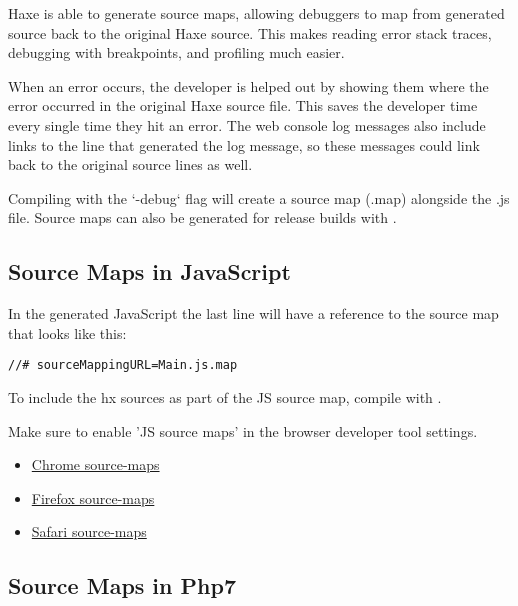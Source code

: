 Haxe is able to generate source maps, allowing debuggers to map from generated source back to the original Haxe source. This makes reading error stack traces, debugging with breakpoints, and profiling much easier.

When an error occurs, the developer is helped out by showing them where the error occurred in the original Haxe source file. This saves the developer time every single time they hit an error. The web console log messages also include links to the line that generated the log message, so these messages could link back to the original source lines as well. 

Compiling with the `-debug` flag will create a source map (.map) alongside the .js file. Source maps can also be generated for release builds with .


\subsection{Source Maps in JavaScript}
\label{debugging-source-map-javascript}

In the generated JavaScript the last line will have a reference to the source map that looks like this:

\begin{lstlisting}
//# sourceMappingURL=Main.js.map
\end{lstlisting}

To include the hx sources as part of the JS source map, compile with .

Make sure to enable 'JS source maps' in the browser developer tool settings. 

\begin{itemize}
	\item \href{https://developers.google.com/web/tools/chrome-devtools/debug/readability/source-maps}{Chrome source-maps}
	\item \href{https://developer.mozilla.org/en-US/docs/Tools/Debugger/How_to/Use_a_source_map}{Firefox source-maps}
	\item \href{https://developer.apple.com/library/safari/documentation/AppleApplications/Conceptual/Safari_Developer_Guide/ResourcesandtheDOM/ResourcesandtheDOM.html#//apple_ref/doc/uid/TP40007874-CH3-SW2}{Safari source-maps}
\end{itemize}

\subsection{Source Maps in Php7}
\label{debugging-sourcemap-php7}


